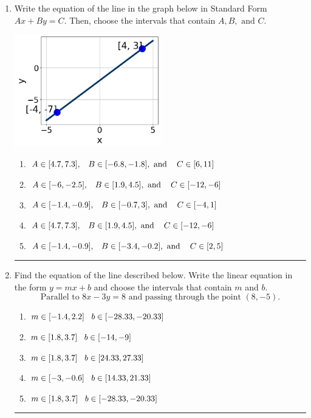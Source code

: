 \documentclass[14pt]{extbook}
\newcommand{\litem}[1]{\item#1\hspace*{-1cm}\rule{\textwidth}{0.4pt}}
\begin{document}
\begin{enumerate}
{\begin{enumerate}[label=\Alph*.]
\end{enumerate} }
\litem{
Write the equation of the line in the graph below in Standard Form $Ax+By=C$. Then, choose the intervals that contain $A, B, \text{ and } C$.
\begin{center}
    \includegraphics[width=0.5\textwidth]{../Figures/linearGraphToStandardB.png}
\end{center}
\begin{enumerate}[label=\Alph*.]
\item \( A \in [4.7, 7.3], \hspace{3mm} B \in [-6.8, -1.8], \text{ and } \hspace{3mm} C \in [6, 11] \)
\item \( A \in [-6, -2.5], \hspace{3mm} B \in [1.9, 4.5], \text{ and } \hspace{3mm} C \in [-12, -6] \)
\item \( A \in [-1.4, -0.9], \hspace{3mm} B \in [-0.7, 3], \text{ and } \hspace{3mm} C \in [-4, 1] \)
\item \( A \in [4.7, 7.3], \hspace{3mm} B \in [1.9, 4.5], \text{ and } \hspace{3mm} C \in [-12, -6] \)
\item \( A \in [-1.4, -0.9], \hspace{3mm} B \in [-3.4, -0.2], \text{ and } \hspace{3mm} C \in [2, 5] \)

\end{enumerate} }
\litem{
Find the equation of the line described below. Write the linear equation in the form $ y=mx+b $ and choose the intervals that contain $m$ and $b$.\[ \text{Parallel to } 8 x - 3 y = 8 \text{ and passing through the point } (8, -5). \]\begin{enumerate}[label=\Alph*.]
\item \( m \in [-1.4, 2.2] \hspace*{3mm} b \in [-28.33, -20.33] \)
\item \( m \in [1.8, 3.7] \hspace*{3mm} b \in [-14, -9] \)
\item \( m \in [1.8, 3.7] \hspace*{3mm} b \in [24.33, 27.33] \)
\item \( m \in [-3, -0.6] \hspace*{3mm} b \in [14.33, 21.33] \)
\item \( m \in [1.8, 3.7] \hspace*{3mm} b \in [-28.33, -20.33] \)


\end{enumerate}}
\end{enumerate}
\end{document}
